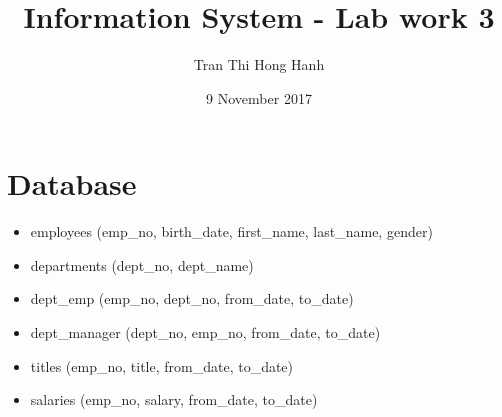 \documentclass{article}
\title{Information System - Lab work 3}
\author{Tran Thi Hong Hanh}
\date{9 November 2017}
\begin{document}
\maketitle
\section*{Database}
\begin{itemize}
	\item employees (emp\_no, birth\_date, first\_name, last\_name, gender)
	\item departments (dept\_no, dept\_name)
	\item dept\_emp (emp\_no, dept\_no, from\_date, to\_date)
	\item dept\_manager (dept\_no, emp\_no, from\_date, to\_date)
	\item titles (emp\_no, title, from\_date, to\_date)
	\item salaries (emp\_no, salary, from\_date, to\_date)
\end{itemize}
\end{document}
